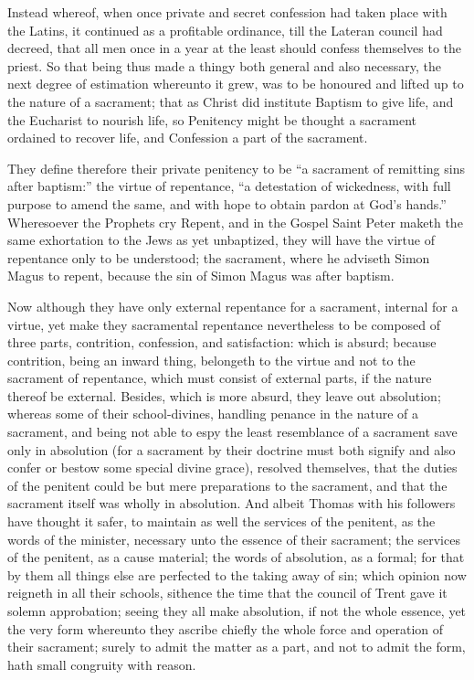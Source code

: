 Instead whereof, when once private and secret confession had taken place with the Latins, it continued as a profitable ordinance, till the Lateran council had decreed, that all men once in a year at the least should confess themselves to the priest. So that being thus made a thingy both general and also necessary, the next degree of estimation whereunto it grew, was to be honoured and lifted up to the nature of a sacrament; that as Christ did institute Baptism to give life, and the Eucharist to nourish life, so Penitency might be thought a sacrament ordained to recover life, and Confession a part of the sacrament.

They define therefore their private penitency to be “a sacrament of remitting sins after baptism:” the virtue of repentance, “a detestation of wickedness, with full purpose to amend the same, and with hope to obtain pardon at God’s hands.” Wheresoever the Prophets cry Repent, and in the Gospel Saint Peter maketh the same exhortation to the Jews as yet unbaptized, they will have the virtue of repentance only to be understood; the sacrament, where he adviseth Simon Magus to repent, because the sin of Simon Magus was after baptism.

Now although they have only external repentance for a sacrament, internal for a virtue, yet make they sacramental repentance nevertheless to be composed of three parts, contrition, confession, and satisfaction: which is absurd; because contrition, being an inward thing, belongeth to the virtue and not to the sacrament of repentance, which must consist of external parts, if the nature thereof be external. Besides, which is more absurd, they leave out absolution; whereas some of their school-divines, handling penance in the nature of a sacrament, and being not able to espy the least resemblance of a sacrament save only in absolution (for a sacrament by their doctrine must both signify and also confer or bestow some special divine grace), resolved themselves, that the duties of the penitent could be but mere preparations to the sacrament, and that the sacrament itself was wholly in absolution. And albeit Thomas with his followers have thought it safer, to maintain as well the services of the penitent, as the words of the minister, necessary unto the essence of their sacrament; the services of the penitent, as a cause material; the words of absolution, as a formal; for that by them all things else are perfected to the taking away of sin; which opinion now reigneth in all their schools, sithence the time that the council of Trent gave it solemn approbation; seeing they all make absolution, if not the whole essence, yet the very form whereunto they ascribe chiefly the whole force and operation of their sacrament; surely to admit the matter as a part, and not to admit the form, hath small congruity with reason.

